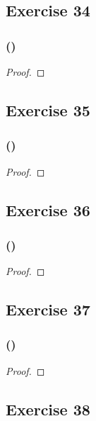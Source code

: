 \documentclass[14pt]{extarticle}
\begin{document}
\subsection{Exercise 34}

\subsubsection{()}

\begin{proof}

\end{proof}

\subsection{Exercise 35}

\subsubsection{()}

\begin{proof}

\end{proof}

\subsection{Exercise 36}

\subsubsection{()}

\begin{proof}

\end{proof}

\subsection{Exercise 37}

\subsubsection{()}

\begin{proof}

\end{proof}

\subsection{Exercise 38}
\end{document}
